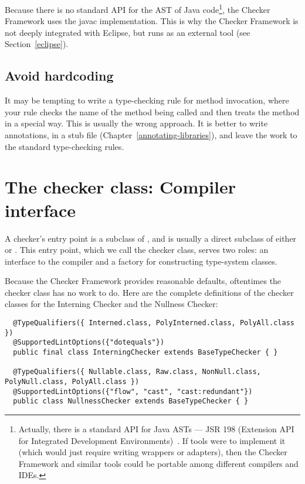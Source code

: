 Because there is no standard API for the AST of Java code\footnote{Actually,
there is a standard API for Java ASTs --- JSR 198 (Extension API for
Integrated Development Environments)~\cite{JSR198}.  If tools were to
implement it
(which would just require writing wrappers or adapters), then the Checker
Framework and similar tools could be portable among different compilers and
IDEs.}, the Checker
Framework uses the javac implementation.  This is why the Checker Framework
is not deeply integrated with Eclipse, but runs as an external tool (see
Section~\ref{eclipse}).


\subsection{Avoid hardcoding\label{avoid-hardcoding}}

It may be tempting to write a type-checking rule for method invocation,
where your rule checks the name of the method being called and then treats
the method in a special way.  This is usually the wrong approach.  It
is better to write annotations, in a stub file
(Chapter~\ref{annotating-libraries}), and leave the work to the standard
type-checking rules.


\section{The checker class:  Compiler interface\label{writing-compiler-interface}}

A checker's entry point is a subclass of
, and is usually a direct subclass
of either  or
.
This entry
point, which we call the checker class, serves two
roles:  an interface to the compiler and a factory for constructing
type-system classes.

Because the Checker Framework provides reasonable defaults, oftentimes the
checker class has no work to do.  Here are the complete definitions of the
checker classes for the Interning Checker and the Nullness Checker:

\begin{Verbatim}
  @TypeQualifiers({ Interned.class, PolyInterned.class, PolyAll.class })
  @SupportedLintOptions({"dotequals"})
  public final class InterningChecker extends BaseTypeChecker { }

  @TypeQualifiers({ Nullable.class, Raw.class, NonNull.class, PolyNull.class, PolyAll.class })
  @SupportedLintOptions({"flow", "cast", "cast:redundant"})
  public class NullnessChecker extends BaseTypeChecker { }
\end{Verbatim}


